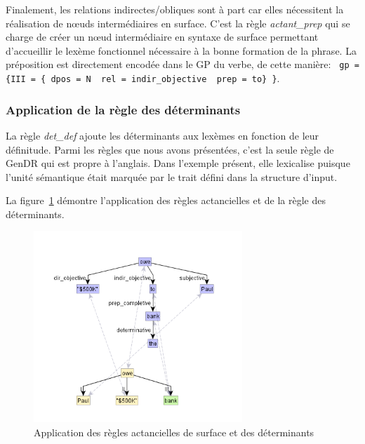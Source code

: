 Finalement, les relations indirectes/obliques sont à part car elles nécessitent la réalisation de n\oe{}uds intermédiaires en surface. C'est la règle \emph{actant\_prep} qui se charge de créer un n\oe{}ud intermédiaire en syntaxe de surface permettant d'accueillir le lexème fonctionnel nécessaire à la bonne formation de la phrase. La préposition est directement encodée dans le \ac{GP} du verbe, de cette manière: \lstinline! gp = {III = { dpos = N  rel = indir_objective  prep = to} }!.

\subsubsection{Application de la règle des déterminants}

La règle \emph{det\_def} ajoute les déterminants aux lexèmes en fonction de leur définitude. Parmi les règles que nous avons présentées, c'est la seule règle de GenDR qui est propre à l'anglais. Dans l'exemple présent, elle lexicalise  puisque l'unité sémantique  était marquée par le trait défini dans la structure d'input.

La figure~\ref{fig:syntsurf} démontre l'application des règles actancielles et de la règle des déterminants.

\begin{figure}[htb]
	\centering
	\includegraphics[width=0.7\textwidth, trim = {0cm 8mm 0cm 15mm},clip]{ch3/figs/rsynts_syntactisation.png}
	\caption{Application des règles actancielles de surface et des déterminants}
	\label{fig:syntsurf}
\end{figure}

